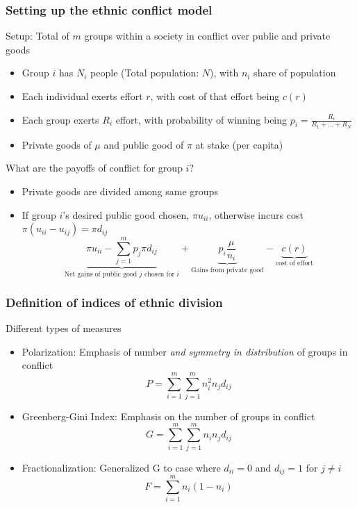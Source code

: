 \documentclass[aspectratio=169]{beamer}
\begin{document}
\begin{frame}
\frametitle{Setting up the ethnic conflict model} 
Setup: Total of $m$ groups within a society in conflict over public and private goods
\begin{itemize}\setlength\itemsep{3pt}
\item Group $i$ has $N_i$ people (Total population: $N$), with $n_i$ share of population
\item Each individual exerts effort $r$, with cost of that effort being $c(r)$
\item Each group exerts $R_i$ effort, with probability of winning being $p_i=\frac{R_i}{R_1+...+R_N}$
\item Private goods of $\mu$  and public good of $\pi$ at stake (per capita)
\end{itemize} \medskip
What are the payoffs of conflict for group $i$?
\begin{itemize}\setlength\itemsep{3pt}
  \item Private goods are divided among same groups
  \item If group $i$'s desired public good chosen, $\pi u_{ii}$, otherwise incurs cost $\pi(u_{ii}-u_{ij})=\pi d_{ij}$
  \[
\underbrace{\pi u_{ii} -\sum_{j=1}^m p_j \pi d_{ij}}_{\text{Net gains of public good $j$ chosen for $i$}} + \underbrace{p_i \frac{\mu}{n_i}}_{\text{Gains from private good}} - \underbrace{c(r)}_{\text{cost of effort}}
  \]
\end{itemize}
\end{frame}

\begin{frame}
\frametitle{Definition of indices of ethnic division} 
Different types of measures
\begin{itemize}\setlength\itemsep{3pt}
\item Polarization: Emphasis of number \textit{and symmetry in distribution} of groups in conflict
\[
P = \sum_{i=1}^m\sum_{j=1}^m n_i^2 n_j d_{ij}
\]
\item Greenberg-Gini Index: Emphasis on the number of groups in conflict
\[
G = \sum_{i=1}^m\sum_{j=1}^m n_i n_j d_{ij}
\] 
\item Fractionalization: Generalized G to case where $d_{ii}=0$ and $d_{ij}=1$ for $j\neq i$
 \[
F = \sum_{i=1}^m n_i(1- n_i)
\]

\end{itemize} \medskip
\end{frame}
\end{document}
